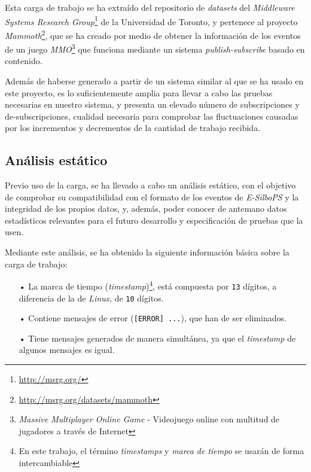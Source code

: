 Esta carga de trabajo se ha extraído del repositorio de \textit{datasets} del 
\textit{Middleware Systems Research Group}\footnote{\href{http://msrg.org/}{http://msrg.org/}}
de la Universidad de Toronto, y pertenece al proyecto
\textit{Mammoth}\footnote{\href{http://msrg.org/datasets/mammoth}{http://msrg.org/datasets/mammoth}},
que se ha creado por medio de obtener la información de los eventos de un juego 
\textit{MMO}\footnote{\textit{Massive Multiplayer Online Game} - Videojuego online con multitud de 
jugadores a través de Internet} que funciona mediante un sistema \textit{publish-subscribe} basado
en contenido.

Además de haberse generado a partir de un sistema similar al que se ha usado en este proyecto, es lo 
suficientemente amplia para llevar a cabo las pruebas necesarias en nuestro sistema, y presenta un
elevado número de subscripciones y de-subscripciones, cualidad necesaria para comprobar las 
fluctuaciones causadas por los incrementos y decrementos de la cantidad de trabajo recibida.


\subsection{Análisis estático} \label{ssct:desarrollo_carga_analisis}


Previo uso de la carga, se ha llevado a cabo un análisis estático, con el objetivo de comprobar su
compatibilidad con el formato de los eventos de \textit{E-SilboPS} y la integridad de los propios 
datos, y, además, poder conocer de antemano datos estadísticos relevantes para el futuro desarrollo
y especificación de pruebas que la usen.

Mediante este análisis, se ha obtenido la siguiente información básica sobre la carga de trabajo:
\begin{itemize}
    \item[•] La marca de tiempo (\textit{timestamp})\footnote{En este trabajo, el término
    \textit{timestamps} y \textit{marca de tiempo} se usarán de forma intercambiable}, está
    compuesta por \texttt{13} dígitos, a diferencia de la de \textit{Linux}, de \texttt{10} dígitos.
    \item[•] Contiene mensajes de error (\texttt{[ERROR] ...}), que han de ser eliminados.
    \item[•] Tiene mensajes generados de manera simultánea, ya que el \textit{timestamp} de algunos
    mensajes es igual.
\end{itemize}

